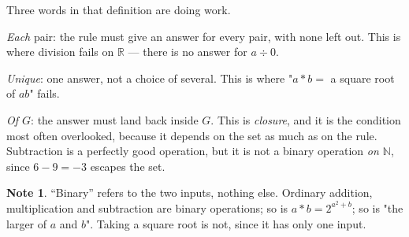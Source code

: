 \documentclass[11pt,a4paper]{article}
\theoremstyle{definition}
\newtheorem{note}[thm]{Note}
\begin{document}
Three words in that definition are doing work.

\emph{Each} pair: the rule must give an answer for every pair, with none left out.
This is where division fails on $\mathbb{R}$ --- there is no answer for $a\div 0$.

\emph{Unique}: one answer, not a choice of several. This is where "$a*b=$ a square
root of $ab$" fails.

\emph{Of $G$}: the answer must land back inside $G$. This is \emph{closure}, and it
is the condition most often overlooked, because it depends on the set as much as
on the rule. Subtraction is a perfectly good operation, but it is not a binary
operation \emph{on $\mathbb{N}$}, since $6-9=-3$ escapes the set.

\begin{note}
``Binary'' refers to the two inputs, nothing else. Ordinary addition, multiplication
and subtraction are binary operations; so is $a*b=2^{a^{2}+b}$; so is "the larger
of $a$ and $b$". Taking a square root is not, since it has only one input.
\end{note}
\end{document}
